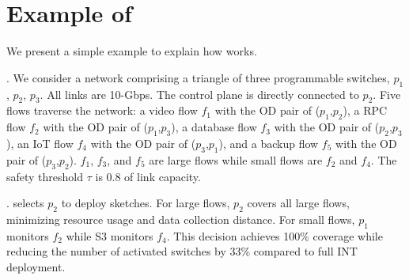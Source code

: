 
\section{Example of \sysname}

We present a simple example to explain how \sysname works. 

. We consider a network comprising a triangle of three programmable switches, $p_1$, $p_2$, $p_3$. All links are 10-Gbps. The control plane is directly connected to $p_2$. Five flows traverse the network: a video flow $f_1$ with the OD pair of ($p_1$,$p_2$), a RPC flow $f_2$ with the OD pair of ($p_1$,$p_3$), a database flow $f_3$ with the OD pair of ($p_2$,$p_3$), an IoT flow $f_4$ with the OD pair of ($p_3$,$p_1$), and a backup flow $f_5$ with the OD pair of ($p_3$,$p_2$). $f_1$, $f_3$, and $f_5$ are large flows while small flows are $f_2$ and $f_4$. The safety threshold $\tau$ is 0.8 of link capacity. 

. \sysname selects $p_2$ to deploy sketches. For large flows, $p_2$ covers all large flows, minimizing resource usage and data collection distance. For small flows, $p_1$ monitors $f_2$ while S3 monitors $f_4$. This decision achieves 100\% coverage while reducing the number of activated switches by 33\% compared to full INT deployment. 


